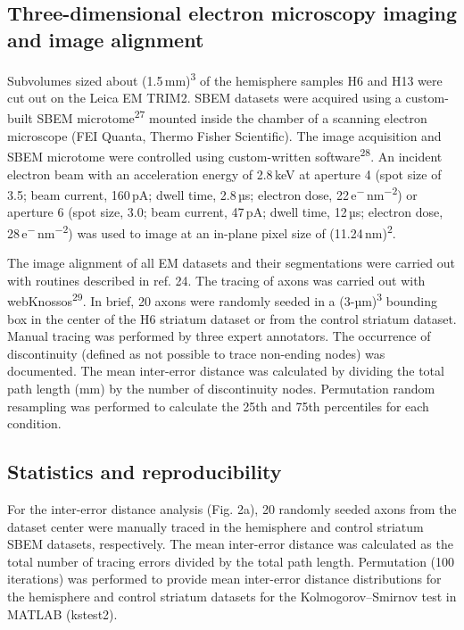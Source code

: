 \documentclass{article}
\begin{document}
\subsection*{Three-dimensional electron microscopy imaging and image alignment}
Subvolumes sized about (1.5\,mm)\textsuperscript{3} of the hemisphere samples H6 and H13 were cut out on the Leica EM TRIM2. SBEM datasets were acquired using a custom-built SBEM microtome\textsuperscript{27} mounted inside the chamber of a scanning electron microscope (FEI Quanta, Thermo Fisher Scientific). The image acquisition and SBEM microtome were controlled using custom-written software\textsuperscript{28}. An incident electron beam with an acceleration energy of 2.8\,keV at aperture 4 (spot size of 3.5; beam current, 160\,pA; dwell time, 2.8\,µs; electron dose, 22\,e\textsuperscript{−}\,nm\textsuperscript{−2}) or aperture 6 (spot size, 3.0; beam current, 47\,pA; dwell time, 12\,µs; electron dose, 28\,e\textsuperscript{−}\,nm\textsuperscript{−2}) was used to image at an in-plane pixel size of (11.24\,nm)\textsuperscript{2}.

The image alignment of all EM datasets and their segmentations were carried out with routines described in ref. 24. The tracing of axons was carried out with webKnossos\textsuperscript{29}. In brief, 20 axons were randomly seeded in a (3-µm)\textsuperscript{3} bounding box in the center of the H6 striatum dataset or from the control striatum dataset. Manual tracing was performed by three expert annotators. The occurrence of discontinuity (defined as not possible to trace non-ending nodes) was documented. The mean inter-error distance was calculated by dividing the total path length (mm) by the number of discontinuity nodes. Permutation random resampling was performed to calculate the 25th and 75th percentiles for each condition.

\subsection*{Statistics and reproducibility}
For the inter-error distance analysis (Fig. 2a), 20 randomly seeded axons from the dataset center were manually traced in the hemisphere and control striatum SBEM datasets, respectively. The mean inter-error distance was calculated as the total number of tracing errors divided by the total path length. Permutation (100 iterations) was performed to provide mean inter-error distance distributions for the hemisphere and control striatum datasets for the Kolmogorov–Smirnov test in MATLAB (kstest2).
\end{document}
